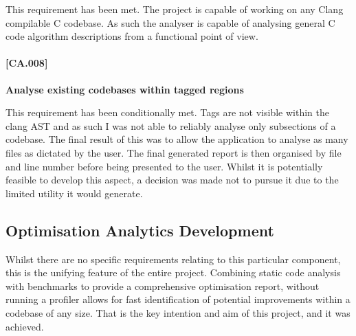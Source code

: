 This requirement has been met. The project is capable of working on any Clang compilable C codebase.
As such the analyser is capable of analysing general C code algorithm descriptions from a functional
point of view.

\paragraph{[CA.008]}
\textbf{Analyse existing codebases within tagged regions}

This requirement has been conditionally met. Tags are not visible within the clang AST and as such I
was not able to reliably analyse only subsections of a codebase. The final result of this was to
allow the application to analyse as many files as dictated by the user. The final generated report
is then organised by file and line number before being presented to the user. Whilst it is
potentially feasible to develop this aspect, a decision was made not to pursue it due to the limited
utility it would generate.

\subsection{Optimisation Analytics Development}

Whilst there are no specific requirements relating to this particular component, this is the
unifying feature of the entire project. Combining static code analysis with benchmarks to provide a
comprehensive optimisation report, without running a profiler allows for fast identification of
potential improvements within a codebase of any size. That is the key intention and aim of this
project, and it was achieved.

